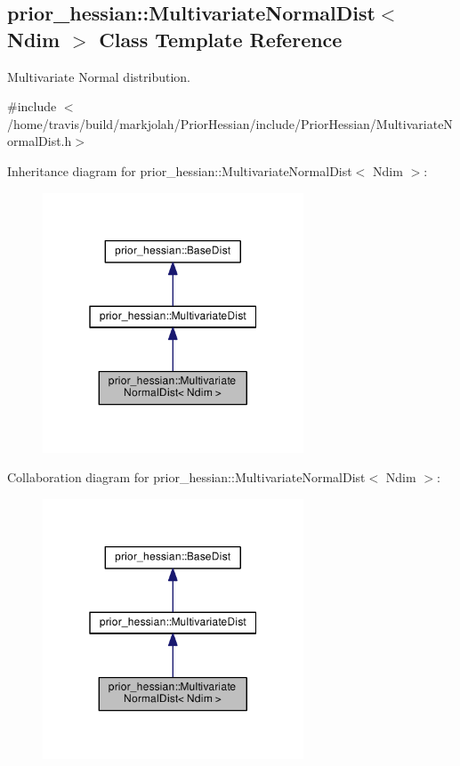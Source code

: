 \hypertarget{classprior__hessian_1_1MultivariateNormalDist}{}\subsection{prior\+\_\+hessian\+:\+:Multivariate\+Normal\+Dist$<$ Ndim $>$ Class Template Reference}
\label{classprior__hessian_1_1MultivariateNormalDist}


Multivariate Normal distribution.  




{\ttfamily \#include $<$/home/travis/build/markjolah/\+Prior\+Hessian/include/\+Prior\+Hessian/\+Multivariate\+Normal\+Dist.\+h$>$}



Inheritance diagram for prior\+\_\+hessian\+:\+:Multivariate\+Normal\+Dist$<$ Ndim $>$\+:\nopagebreak
\begin{figure}[H]
\begin{center}
\leavevmode
\includegraphics[width=220pt]{classprior__hessian_1_1MultivariateNormalDist__inherit__graph}
\end{center}
\end{figure}


Collaboration diagram for prior\+\_\+hessian\+:\+:Multivariate\+Normal\+Dist$<$ Ndim $>$\+:\nopagebreak
\begin{figure}[H]
\begin{center}
\leavevmode
\includegraphics[width=220pt]{classprior__hessian_1_1MultivariateNormalDist__coll__graph}
\end{center}
\end{figure}
